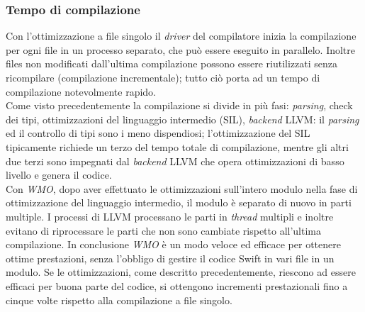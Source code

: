 \subsubsection{Tempo di compilazione}
Con l'ottimizzazione a file singolo il \textit{driver} del compilatore inizia la compilazione per ogni file in un processo separato, che può essere eseguito in parallelo. Inoltre files non modificati dall'ultima compilazione possono essere riutilizzati senza ricompilare (compilazione incrementale); tutto ciò porta ad un tempo di compilazione notevolmente rapido.\\
Come visto precedentemente la compilazione si divide in più fasi: \textit{parsing}, check dei tipi, ottimizzazioni del linguaggio intermedio (SIL), \textit{backend} LLVM: il \textit{parsing} ed il controllo di tipi sono i meno dispendiosi; l'ottimizzazione del SIL tipicamente richiede un terzo del tempo totale di compilazione, mentre gli altri due terzi sono impegnati dal \textit{backend} LLVM che opera ottimizzazioni di basso livello e genera il codice.\\
Con \textit{WMO}, dopo aver effettuato le ottimizzazioni sull'intero modulo nella fase di ottimizzazione del linguaggio intermedio, il modulo è separato di nuovo in parti multiple. I processi di LLVM processano le parti in \textit{thread} multipli e inoltre evitano di riprocessare le parti che non sono cambiate rispetto all'ultima compilazione.
In conclusione \textit{WMO} è un modo veloce ed efficace per ottenere ottime prestazioni, senza l'obbligo di gestire il codice Swift in vari file in un modulo. Se le ottimizzazioni, come descritto precedentemente, riescono ad essere efficaci per buona parte del codice, si ottengono incrementi prestazionali fino a cinque volte rispetto alla compilazione a file singolo. 

